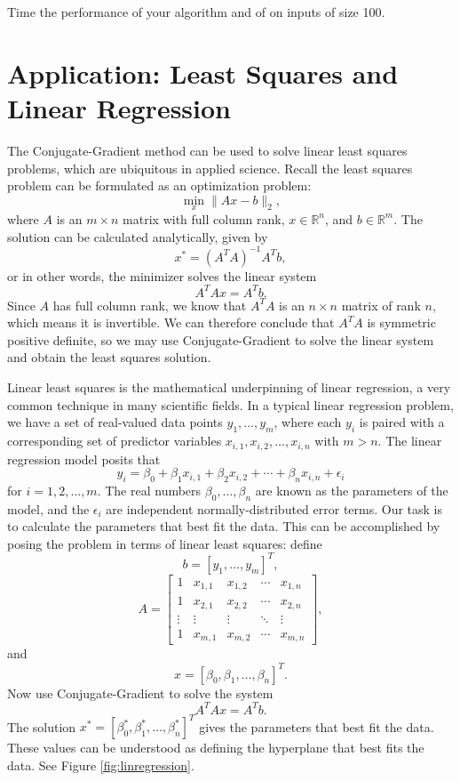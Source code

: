 Time the performance of your algorithm and of  on inputs of size 100.

\section*{Application: Least Squares and Linear Regression}
The Conjugate-Gradient method can be used to solve linear least squares problems, which are ubiquitous in applied science.
Recall the least squares problem can be formulated as an optimization problem:
\[
\min_x \|Ax - b\|_2,
\]
where $A$ is an $m \times n$ matrix with full column rank, $x \in \mathbb{R}^n$, and $b \in \mathbb{R}^m$. The solution can
be calculated analytically, given by
\[
x^* = (A^TA)^{-1}A^Tb,
\]
or in other words, the minimizer solves the linear system
\[
A^TAx = A^Tb.
\]
Since $A$ has full column rank, we know that $A^TA$ is an $n \times n$ matrix of rank $n$, which means it is invertible. We can
therefore conclude that $A^TA$ is symmetric positive definite, so we may use Conjugate-Gradient to solve the linear system
and obtain the least squares solution.

Linear least squares is the mathematical underpinning of linear regression, a very common technique in many scientific fields.
In a typical linear regression problem, we have a set of real-valued data points $y_1,\ldots, y_m$, where each
$y_i$ is paired with a corresponding set of predictor variables $x_{i,1}, x_{i,2}, \ldots, x_{i,n}$ with $m > n$.
The linear regression model posits that
\[
y_i = \beta_0 + \beta_1x_{i,1} + \beta_2x_{i,2} + \cdots + \beta_nx_{i,n} + \epsilon_i
\]
for $i = 1, 2, \ldots, m$. The real numbers $\beta_0,\ldots,\beta_n$ are known as the parameters of the model, and the
$\epsilon_i$ are independent normally-distributed error terms. Our task is to calculate the parameters that best fit the data.
This can be accomplished by posing the problem in terms of linear least squares: define
\[
b = [y_1, \ldots, y_m]^T,
\]
\[
A =
\begin{bmatrix}
1 & x_{1,1} & x_{1,2} & \cdots & x_{1,n}\\
1 & x_{2,1} & x_{2,2} & \cdots & x_{2,n}\\
\vdots & \vdots & \vdots & \ddots & \vdots\\
1 & x_{m,1} & x_{m,2} & \cdots & x_{m,n}
\end{bmatrix},
\]
and
\[
x = [\beta_0, \beta_1,\ldots, \beta_n]^T.
\]
Now use Conjugate-Gradient to solve the system
\[
A^TAx = A^Tb.
\]
The solution $x^* = [\beta_0^*, \beta_1^*, \ldots, \beta_n^*]^T$ gives the parameters that best fit the data.
These values can be understood as defining the hyperplane that best fits the data. See Figure \ref{fig:linregression}.

